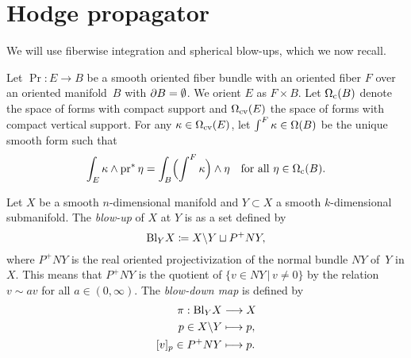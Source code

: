 \documentclass[\MainFolder/Text.tex]{subfiles}
\begin{document}
\section{Hodge propagator} \label{Section:Proof1}
\allowdisplaybreaks
{}

We will use fiberwise integration and spherical blow-ups, which we now recall.


\begin{Definition} \label{Def:FibInt}
Let $\Pr: E \rightarrow B$ be a smooth oriented fiber bundle with an oriented fiber $F$ over an oriented manifold~$B$ with $\partial B = \emptyset$.
We orient $E$ as $F\times B$.
Let 
$\Omega_{\mathrm{c}} (B)$ denote the space of forms with compact support and $\Omega_{\mathrm{cv}}(E)$ the space of forms with compact vertical support.
For any $\kappa\in \Omega_{\mathrm{cv}}(E)$, let $\int^{F} \kappa \in \Omega(B)$ be the unique smooth form such that
\begin{equation*} \label{Eq:FiberInt}
\int_E \kappa \wedge \operatorname{\mathrm{pr}}^*\eta = \int_B \Bigl(\int^{F}\kappa \Bigr) \wedge \eta\quad\text{for all }\eta\in \Omega_{\mathrm{c}} (B).
\end{equation*}
\end{Definition}
 
\begin{Definition}\label{Def:SphBlow}Let $X$ be a smooth $n$-dimensional manifold and $Y\subset X$ a smooth $k$-dimensional submanifold.
The \emph{blow-up} of $X$ at $Y$ is as a set defined by
\[ \mathrm{Bl}_Y X \coloneqq X\backslash Y \sqcup P^+N Y, \]
where $P^+N Y$ is the real oriented projectivization of the normal bundle $NY$ of~$Y$ in $X$.
This means that $P^+NY$ is the quotient of $\{ v\in NY\,
\vert\, v\neq 0\}$ by the relation $v\sim a v$ for all $a\in (0,\infty)$.
The \emph{blow-down map} is defined by
\begin{align*}
 \pi : \mathrm{Bl}_Y X &\longrightarrow X \\
     p\in X\backslash Y &\longmapsto p, \\
     [v]_p\in P^+N Y &\longmapsto p.
\end{align*}
\end{Definition}
\end{document}
